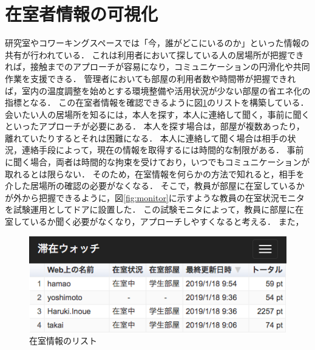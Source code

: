 \section{在室者情報の可視化}\label{3.2}
研究室やコワーキングスペースでは「今，誰がどこにいるのか」といった情報の共有が行われている．
これは利用者において探している人の居場所が把握できれば，接触までのアプローチが容易になり，コミュニケーションの円滑化や共同作業を支援できる．
管理者においても部屋の利用者数や時間帯が把握できれば，室内の温度調整を始めとする環境整備や活用状況が少ない部屋の省エネ化の指標となる．
この在室者情報を確認できるように図\ref{fig:list}のリストを構築している．
会いたい人の居場所を知るには，本人を探す，本人に連絡して聞く，事前に聞くといったアプローチが必要にある．
本人を探す場合は，部屋が複数あったり，離れていたりするとそれは困難になる．
本人に連絡して聞く場合は相手の状況，連絡手段によって，現在の情報を取得するには時間的な制限がある．
事前に聞く場合，両者は時間的な拘束を受けており，いつでもコミュニケーションが取れるとは限らない．
そのため，在室情報を何らかの方法で知れると，相手を介した居場所の確認の必要がなくなる．
そこで，教員が部屋に在室しているかが外から把握できるように，図\ref{fig:monitor}に示すような教員の在室状況モニタを試験運用としてドアに設置した．
この試験モニタによって，教員に部屋に在室しているか聞く必要がなくなり，アプローチしやすくなると考える．
また，


\begin{figure}[H]
  \begin{center}
    \includegraphics[width=150mm]{image/ListOccupancy.png}
    \caption{在室情報のリスト}
    \label{fig:list}
  \end{center}
\end{figure}

